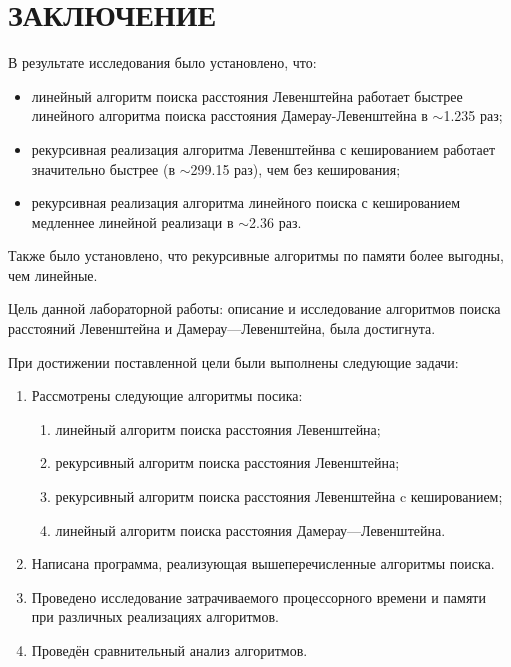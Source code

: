 \chapter*{\hfill{\centering  ЗАКЛЮЧЕНИЕ}\hfill}

В результате исследования было установлено, что:
\begin{itemize}[label=---]
	\item линейный алгоритм поиска расстояния Левенштейна работает быстрее линейного алгоритма поиска расстояния Дамерау-Левенштейна в $\sim$1.235 раз;
	\item рекурсивная реализация алгоритма Левенштейнва с кешированием работает значительно быстрее (в $\sim$299.15 раз), чем без кеширования;
	\item рекурсивная реализация алгоритма линейного поиска с кешированием медленнее линейной реализаци в $\sim$2.36 раз.
\end{itemize}
Также было установлено, что рекурсивные алгоритмы по памяти более выгодны, чем линейные.

Цель данной лабораторной работы: описание и исследование алгоритмов поиска расстояний Левенштейна и Дамерау---Левенштейна, была достигнута.

При достижении поставленной цели были выполнены следующие задачи:
\begin{enumerate}
	\item Рассмотрены следующие алгоритмы посика:
	\begin{enumerate}
		\item линейный алгоритм поиска расстояния Левенштейна;
		\item рекурсивный алгоритм поиска расстояния Левенштейна;
		\item рекурсивный алгоритм поиска расстояния Левенштейна c кешированием;
		\item линейный алгоритм поиска расстояния Дамерау---Левенштейна.
	\end{enumerate}
	\item Написана программа, реализующая вышеперечисленные алгоритмы поиска.
	\item Проведено исследование затрачиваемого процессорного времени и памяти при различных реализациях алгоритмов.
	\item Проведён сравнительный анализ алгоритмов.
\end{enumerate}

